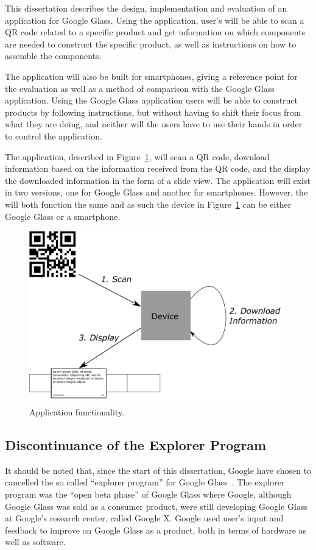 This dissertation describes the design, implementation and evaluation of an application for Google Glass. Using the application, user's will be able to scan a QR code related to a specific product and get information on which components are needed to construct the specific product, as well as instructions on how to assemble the components.

The application will also be built for smartphones, giving a reference point for the evaluation as well as a method of comparison with the Google Glass application. Using the Google Glass application users will be able to construct products by following instructions, but without having to shift their focus from what they are doing, and neither will the users have to use their hands in order to control the application.

The application, described in Figure~\ref{projectmapLightVersion}, will scan a QR code, download information based on the information received from the QR code, and the display the downloaded information in the form of a slide view. The application will exist in two versions, one for Google Glass and another for smartphones. However, the will both function the same and as such the device in Figure~\ref{projectmapLightVersion} can be either Google Glass or a smartphone.

	\begin{figure}[ht!]
		\centering
		\includegraphics[width=110mm]{images/projectmapLightVersion}
		\caption{Application functionality.}
		\label{projectmapLightVersion}
	\end{figure}

\subsection{Discontinuance of the Explorer Program}
It should be noted that, since the start of this dissertation, Google have chosen to cancelled the so called ``explorer program'' for Google Glass~\cite{glassDiscontinued}. The explorer program was the ``open beta phase'' of Google Glass where Google, although Google Glass was sold as a consumer product, were still developing Google Glass at Google's research center, called Google X. Google used user's input and feedback to improve on Google Glass as a product, both in terms of hardware as well as software.

